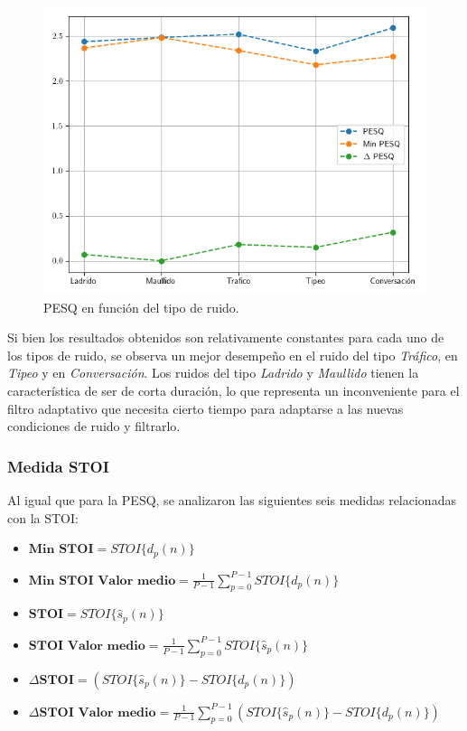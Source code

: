 \begin{figure}
	\centering
	\centerline{\includegraphics[scale=0.75]{images/ch6/af_metric_PESQ_noises.png}}
	\caption{PESQ en función del tipo de ruido.}
	\label{fig:ch6_pesq_resume_by_noise}
\end{figure} 

Si bien los resultados obtenidos son relativamente constantes para cada uno de los tipos de ruido, se observa un mejor desempeño en el ruido del tipo \emph{Tráfico}, en \emph{Tipeo} y en \emph{Conversación}. Los ruidos del tipo \emph{Ladrido} y \emph{Maullido} tienen la característica de ser de corta duración, lo que representa un inconveniente para el filtro adaptativo que necesita cierto tiempo para adaptarse a las nuevas condiciones de ruido y filtrarlo.

\subsubsection{Medida STOI}

Al igual que para la PESQ, se analizaron las siguientes seis medidas relacionadas con la STOI:

\begin{itemize}
	\item $\textbf{Min STOI} = STOI\{ d_p(n) \}$
	\item $\textbf{Min STOI Valor medio} = \frac{1}{P-1} \sum_{p=0}^{P-1} STOI\{ d_p(n) \}$
	\item $\textbf{STOI} = STOI\{ \hat{s}_p(n) \}$
	\item $\textbf{STOI Valor medio} = \frac{1}{P-1} \sum_{p=0}^{P-1} STOI\{ \hat{s}_p(n) \}$
	\item $\Delta \textbf{STOI} = \left( STOI\{ \hat{s}_p(n) \} - STOI\{ d_p(n) \} \right)$
	\item $\Delta \textbf{STOI Valor medio} = \frac{1}{P-1} \sum_{p=0}^{P-1} \left( STOI\{ \hat{s}_p(n) \} - STOI\{ d_p(n) \} \right)$
\end{itemize}


